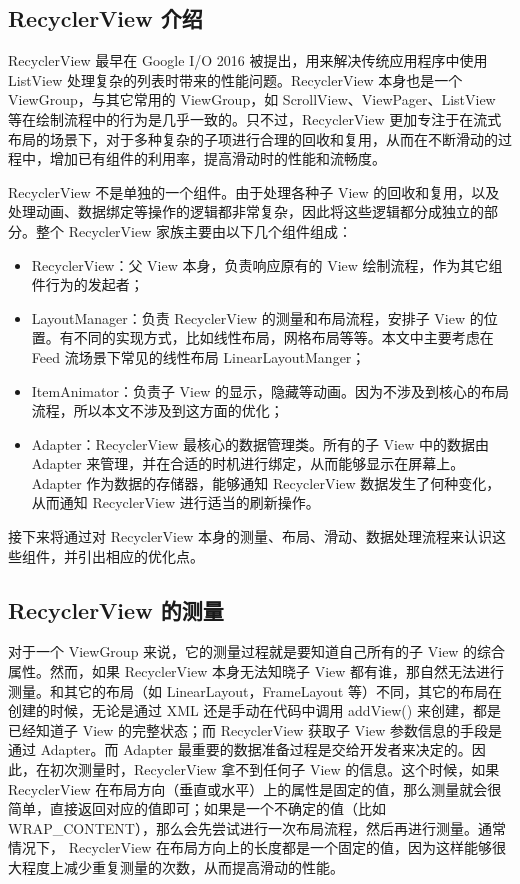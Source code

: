 \subsection{RecyclerView 介绍}

RecyclerView 最早在 Google I/O 2016 被提出，用来解决传统应用程序中使用 ListView 处理复杂的列表时带来的性能问题。RecyclerView 本身也是一个 ViewGroup，与其它常用的 ViewGroup，如 ScrollView、ViewPager、ListView 等在绘制流程中的行为是几乎一致的\cite{mawlood2022listview}。只不过，RecyclerView 更加专注于在流式布局的场景下，对于多种复杂的子项进行合理的回收和复用，从而在不断滑动的过程中，增加已有组件的利用率，提高滑动时的性能和流畅度。

RecyclerView 不是单独的一个组件。由于处理各种子 View 的回收和复用，以及处理动画、数据绑定等操作的逻辑都非常复杂，因此将这些逻辑都分成独立的部分。整个 RecyclerView 家族主要由以下几个组件组成：

\begin{itemize}
    \item RecyclerView：父 View 本身，负责响应原有的 View 绘制流程，作为其它组件行为的发起者；
    \item LayoutManager：负责 RecyclerView 的测量和布局流程，安排子 View 的位置。有不同的实现方式，比如线性布局，网格布局等等。本文中主要考虑在 Feed 流场景下常见的线性布局 LinearLayoutManger；
    \item ItemAnimator：负责子 View 的显示，隐藏等动画。因为不涉及到核心的布局流程，所以本文不涉及到这方面的优化；
    \item Adapter：RecyclerView 最核心的数据管理类。所有的子 View 中的数据由 Adapter 来管理，并在合适的时机进行绑定，从而能够显示在屏幕上。Adapter 作为数据的存储器，能够通知 RecyclerView 数据发生了何种变化，从而通知 RecyclerView 进行适当的刷新操作。
\end{itemize}

接下来将通过对 RecyclerView 本身的测量、布局、滑动、数据处理流程来认识这些组件，并引出相应的优化点。

\subsection{RecyclerView 的测量}

对于一个 ViewGroup 来说，它的测量过程就是要知道自己所有的子 View 的综合属性。然而，如果 RecyclerView 本身无法知晓子 View 都有谁，那自然无法进行测量。和其它的布局（如 LinearLayout，FrameLayout 等）不同，其它的布局在创建的时候，无论是通过 XML 还是手动在代码中调用 addView() 来创建，都是已经知道子 View 的完整状态；而 RecyclerView 获取子 View 参数信息的手段是通过 Adapter。而 Adapter 最重要的数据准备过程是交给开发者来决定的。因此，在初次测量时，RecyclerView 拿不到任何子 View 的信息。这个时候，如果RecyclerView 在布局方向（垂直或水平）上的属性是固定的值，那么测量就会很简单，直接返回对应的值即可；如果是一个不确定的值（比如 WRAP\_CONTENT），那么会先尝试进行一次布局流程，然后再进行测量。通常情况下， RecyclerView 在布局方向上的长度都是一个固定的值，因为这样能够很大程度上减少重复测量的次数，从而提高滑动的性能。

